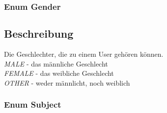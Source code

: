 \documentclass[a4paper]{scrreprt}
\begin{document}
\subsubsection{Enum Gender}
\subsection*{Beschreibung}
Die Geschlechter, die zu einem User gehören können. \\
\textit{MALE} - das männliche Geschlecht \\
\textit{FEMALE} - das weibliche Geschlecht \\
\textit{OTHER} - weder männlicht, noch weiblich \\

\subsubsection{Enum Subject}
\end{document}
